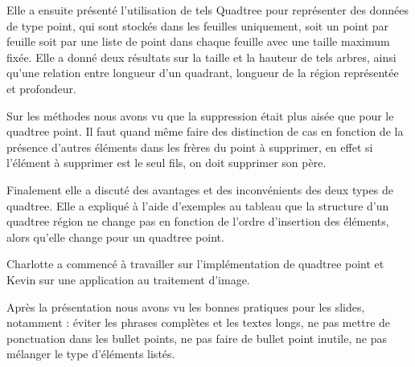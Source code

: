 \documentclass{report}
\begin{document}
Elle a ensuite présenté l'utilisation de tels Quadtree pour représenter des données de type point, qui sont stockés dans les feuilles uniquement, soit un point par feuille soit par une liste de point dans chaque feuille avec une taille maximum fixée. Elle a donné deux résultats sur la taille et la hauteur de tels arbres, ainsi qu'une relation entre longueur d'un quadrant, longueur de la région représentée et profondeur.

Sur les méthodes nous avons vu que la suppression était plus aisée que pour le quadtree point. Il faut quand même faire des distinction de cas en fonction de la présence d'autres éléments dans les frères du point à supprimer, en effet si l'élément à supprimer est le seul fils, on doit supprimer son père. 

Finalement elle a discuté des avantages et des inconvénients des deux types de quadtree. Elle a expliqué à l'aide d'exemples au tableau que la structure d'un quadtree région ne change pas en fonction de l'ordre d'insertion des éléments, alors qu'elle change pour un quadtree point.

Charlotte a commencé à travailler sur l'implémentation de quadtree point et Kevin sur une application au traitement d'image.

Après la présentation nous avons vu les bonnes pratiques pour les slides, notamment : éviter les phrases complètes et les textes longs, ne pas mettre de ponctuation dans les bullet points, ne pas faire de bullet point inutile, ne pas mélanger le type d'éléments listés.
\end{document}
